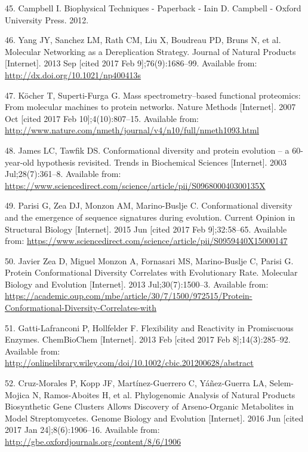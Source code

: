\documentclass[12pt,twoside]{reedthesis}
\begin{document}
  \hypertarget{ref-campbell_biophysical_2012}{}
  45. Campbell I. Biophysical Techniques - Paperback - Iain D. Campbell -
  Oxford University Press. 2012.
  
  \hypertarget{ref-yang_molecular_2013}{}
  46. Yang JY, Sanchez LM, Rath CM, Liu X, Boudreau PD, Bruns N, et al.
  Molecular Networking as a Dereplication Strategy. Journal of Natural
  Products {[}Internet{]}. 2013 Sep {[}cited 2017 Feb 9{]};76(9):1686--99.
  Available from: \url{http://dx.doi.org/10.1021/np400413s}
  
  \hypertarget{ref-kocher_mass_2007}{}
  47. Köcher T, Superti-Furga G. Mass spectrometry--based functional
  proteomics: From molecular machines to protein networks. Nature Methods
  {[}Internet{]}. 2007 Oct {[}cited 2017 Feb 10{]};4(10):807--15.
  Available from:
  \url{http://www.nature.com/nmeth/journal/v4/n10/full/nmeth1093.html}
  
  \hypertarget{ref-james_conformational_2003}{}
  48. James LC, Tawfik DS. Conformational diversity and protein evolution
  -- a 60-year-old hypothesis revisited. Trends in Biochemical Sciences
  {[}Internet{]}. 2003 Jul;28(7):361--8. Available from:
  \url{https://www.sciencedirect.com/science/article/pii/S096800040300135X}
  
  \hypertarget{ref-parisi_conformational_2015}{}
  49. Parisi G, Zea DJ, Monzon AM, Marino-Buslje C. Conformational
  diversity and the emergence of sequence signatures during evolution.
  Current Opinion in Structural Biology {[}Internet{]}. 2015 Jun {[}cited
  2017 Feb 9{]};32:58--65. Available from:
  \url{https://www.sciencedirect.com/science/article/pii/S0959440X15000147}
  
  \hypertarget{ref-javier_zea_protein_2013}{}
  50. Javier Zea D, Miguel Monzon A, Fornasari MS, Marino-Buslje C, Parisi
  G. Protein Conformational Diversity Correlates with Evolutionary Rate.
  Molecular Biology and Evolution {[}Internet{]}. 2013 Jul;30(7):1500--3.
  Available from:
  \url{https://academic.oup.com/mbe/article/30/7/1500/972515/Protein-Conformational-Diversity-Correlates-with}
  
  \hypertarget{ref-gatti-lafranconi_flexibility_2013}{}
  51. Gatti-Lafranconi P, Hollfelder F. Flexibility and Reactivity in
  Promiscuous Enzymes. ChemBioChem {[}Internet{]}. 2013 Feb {[}cited 2017
  Feb 8{]};14(3):285--92. Available from:
  \url{http://onlinelibrary.wiley.com/doi/10.1002/cbic.201200628/abstract}
  
  \hypertarget{ref-cruz-morales_phylogenomic_2016}{}
  52. Cruz-Morales P, Kopp JF, Martínez-Guerrero C, Yáñez-Guerra LA,
  Selem-Mojica N, Ramos-Aboites H, et al. Phylogenomic Analysis of Natural
  Products Biosynthetic Gene Clusters Allows Discovery of Arseno-Organic
  Metabolites in Model Streptomycetes. Genome Biology and Evolution
  {[}Internet{]}. 2016 Jun {[}cited 2017 Jan 24{]};8(6):1906--16.
  Available from: \url{http://gbe.oxfordjournals.org/content/8/6/1906}
  
\end{document}
